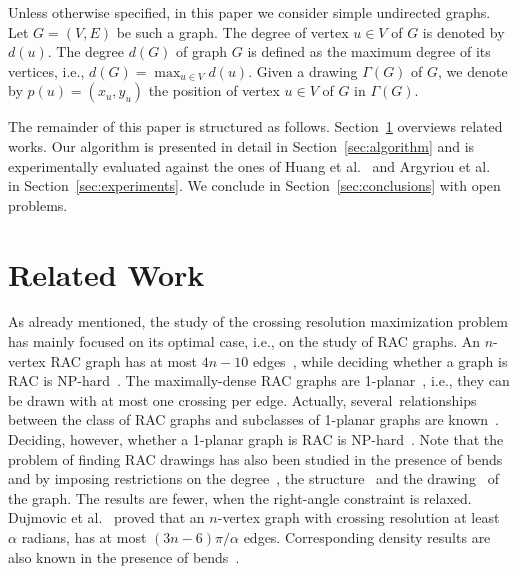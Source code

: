 \documentclass[runningheads]{llncs}
\begin{document}
\medskip{}
Unless otherwise specified, in this paper we consider simple undirected graphs. Let $G=(V,E)$ be such a graph. The degree of vertex $u\in V$ of $G$ is denoted by $d(u)$. The degree $d(G)$ of  graph $G$ is defined as the maximum degree of its vertices, i.e., $d(G)=\max_{u\in V}d(u)$.
%
Given a drawing $\Gamma(G)$ of $G$, we denote by $p(u)=(x_u,y_u)$ the position of vertex $u \in V$ of $G$ in $\Gamma(G)$. %

\medskip{}
The remainder of this paper is structured as follows. Section~\ref{sec:relatedwork} overviews related works. 
Our algorithm is presented in detail in Section~\ref{sec:algorithm} and is experimentally evaluated against the ones of Huang et al.~\cite{DBLP:journals/vlc/HuangEHL13} and Argyriou et al.~\cite{DBLP:journals/cj/ArgyriouBS13} in Section~\ref{sec:experiments}. We conclude in Section~\ref{sec:conclusions} with open problems.
 
\section{Related Work}
\label{sec:relatedwork}

As already mentioned, the study of the crossing resolution maximization problem has mainly focused on its optimal case, i.e., on the study of RAC graphs. An $n$-vertex RAC graph has at most $4n-10$ edges~\cite{DBLP:journals/tcs/DidimoEL11}, while deciding whether a graph is RAC is NP-hard~\cite{DBLP:journals/jgaa/ArgyriouBS12}. The maximally-dense RAC graphs are 1-planar~\cite{DBLP:journals/dam/EadesL13}, i.e., they can be drawn with at most one crossing per edge. Actually, several~relationships between the class of RAC graphs and subclasses of 1-planar graphs are known~\cite{DBLP:journals/dam/BachmaierBHNR17,DBLP:journals/tcs/BrandenburgDEKL16}. Deciding, however, whether a 1-planar graph is RAC is NP-hard~\cite{DBLP:journals/tcs/BekosDLMM17}. Note that the problem of finding RAC drawings has also been studied in the presence of bends~\cite{DBLP:journals/jgaa/AngeliniCDFBKS11,DBLP:journals/comgeo/ArikushiFKMT12,DBLP:journals/tcs/DidimoEL11,DBLP:journals/mst/GiacomoDLM11} and by imposing restrictions on the degree~\cite{DBLP:conf/s-egc/AngeliniBDFHKLL11}, the structure~\cite{DBLP:journals/ipl/DidimoEL10} and the drawing~\cite{DBLP:journals/algorithmica/GiacomoDEL14,DBLP:conf/wg/HongN15} of the graph. The results are fewer, when the right-angle constraint is relaxed. Dujmovic et al.~\cite{DBLP:journals/cjtcs/DujmovicGMW11} proved that an $n$-vertex graph with crossing resolution at least $\alpha$ radians, has at most $(3n-6)\pi/\alpha$ edges. Corresponding density results are also known in the presence of bends~\cite{DBLP:journals/siamdm/AckermanFT12,DBLP:journals/mst/GiacomoDLM11}.
\end{document}
